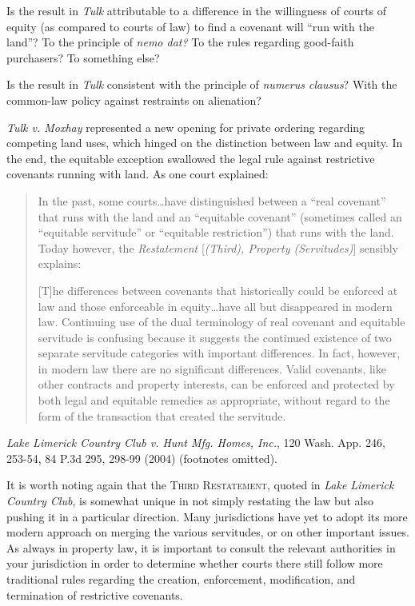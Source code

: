 
\item Is the result in \textit{Tulk} attributable to a difference in the
willingness of courts of equity (as compared to courts of law) to find a
covenant will ``run with the land''? To the principle of \textit{nemo dat?} To
the rules regarding good-faith purchasers? To something else?


\item Is the result in \textit{Tulk} consistent with the principle of
\textit{numerus clausus}? With the common-law policy against restraints on
alienation?

\item \textit{Tulk v. Moxhay} represented a new opening for private ordering
regarding competing land uses, which hinged on the distinction between law and
equity. In the end, the equitable exception swallowed the legal rule against
restrictive covenants running with land. As one court explained:
\begin{quotation}
In the past, some courts\ldots have distinguished between a ``real covenant''
that runs with the land and an ``equitable covenant'' (sometimes called an
``equitable servitude'' or ``equitable restriction'') that runs with the land.
Today however, the \textit{Restatement} [\textit{(Third), Property
(Servitudes)}] sensibly explains:

[T]he differences between covenants that historically could be enforced at law
and those enforceable in equity\ldots have all but disappeared in modern law.
Continuing use of the dual terminology of real covenant and equitable servitude
is confusing because it suggests the continued existence of two separate
servitude categories with important differences. In fact, however, in modern law
there are no significant differences. Valid covenants, like other contracts and
property interests, can be enforced and protected by both legal and equitable
remedies as appropriate, without regard to the form of the transaction that
created the servitude.
\end{quotation}
\emph{Lake Limerick Country Club v. Hunt Mfg. Homes, Inc.}, 120 Wash. App. 246,
253-54, 84 P.3d 295, 298-99 (2004) (footnotes omitted).

\item It is worth noting again that the \textsc{Third Restatement}, quoted in
\textit{Lake Limerick Country Club}, is somewhat unique in not simply restating
the law but also pushing it in a particular direction. Many jurisdictions have
yet to adopt its more modern approach on merging the various servitudes, or on
other important issues. As always in property law, it is important to consult
the relevant authorities in your jurisdiction in order to determine whether
courts there still follow more traditional rules regarding the creation,
enforcement, modification, and termination of restrictive covenants.

